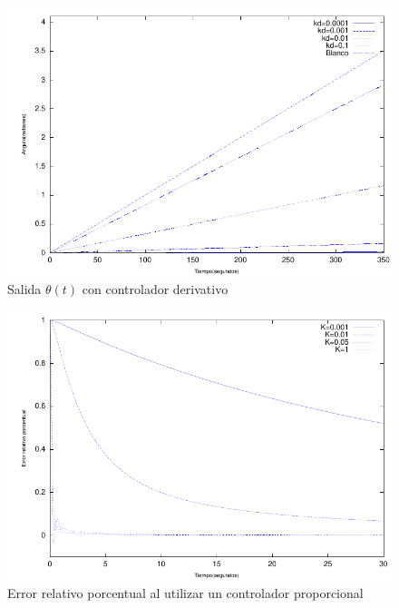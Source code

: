 \documentclass{sig-alternate}
\begin{document}
\begin{figure}[hp]
\label{mDerivativo}
\centering
\includegraphics[scale=0.8]{graficos/mDerivativo}
\caption{Salida $\theta(t)$ con controlador derivativo}
\end{figure}

\begin{figure}[hp]
\label{errorMProporcional}
\centering
\includegraphics[scale=0.8]{graficos/errorMProporcional}
\caption{Error relativo porcentual al utilizar un controlador proporcional}
\end{figure}
\end{document}
